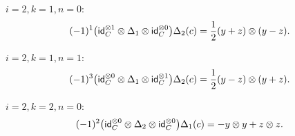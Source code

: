 \noindent $i=2, k=1, n=0$:
\[
(-1)^1 \big( \mathsf{id}_C^{\otimes 1} \otimes \Delta_1 \otimes \mathsf{id}_C^{\otimes 0} \big) \Delta_{2}(c) =
\frac{1}{2}(y+z) \otimes (y-z).
\]

\noindent $i=2, k=1, n=1$:
\[
(-1)^3 \big( \mathsf{id}_C^{\otimes 0} \otimes \Delta_1 \otimes \mathsf{id}_C^{\otimes 1} \big) \Delta_{2}(c) =
\frac{1}{2}(y-z) \otimes (y+z).
\]

\noindent $i=2, k=2, n=0$:
\[
(-1)^2 \big( \mathsf{id}_C^{\otimes 0} \otimes \Delta_2 \otimes \mathsf{id}_C^{\otimes 0} \big) \Delta_{1}(c) =
- y \otimes y + z \otimes z.
\]